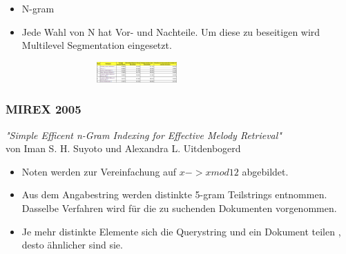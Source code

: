 \documentclass{beamer}
\begin{document}
		\begin{frame}
			\begin{itemize}
				\item N-gram 
				\item Jede Wahl von N hat Vor- und Nachteile. Um diese zu beseitigen wird Multilevel Segmentation eingesetzt.
			\end{itemize}
		\end{frame}

		\begin{frame}
			\begin{figure}[h!]
				\includegraphics[width=300px,height=30px,keepaspectratio]{mirex_2005_results}
			\end{figure}
		\end{frame}

	
		\begin{frame}
			\frametitle{MIREX 2005}
			\begin{minipage}{0.45\textwidth}
				\begin{center}
					\textit{"Simple Efficent n-Gram Indexing for Effective Melody Retrieval"} 
					\cite{mirex_2005_two}\\ 
					von Iman S. H. Suyoto und Alexandra L. Uitdenbogerd
				\end{center}
			\end{minipage}%
			\begin{minipage}{0.45\textwidth}
				\begin{figure}[h!]
				\end{figure}
			\end{minipage}
		\end{frame}

		\begin{frame}
			\begin{itemize}
				\item Noten werden zur Vereinfachung auf $x -> x mod 12$ abgebildet.
				\item Aus dem Angabestring werden distinkte 5-gram Teilstrings entnommen. Dasselbe Verfahren wird für die zu suchenden Dokumenten vorgenommen.
				\item Je mehr distinkte Elemente sich die Querystring und ein Dokument teilen , desto ähnlicher sind sie. 
			\end{itemize}
		\end{frame}
\end{document}
